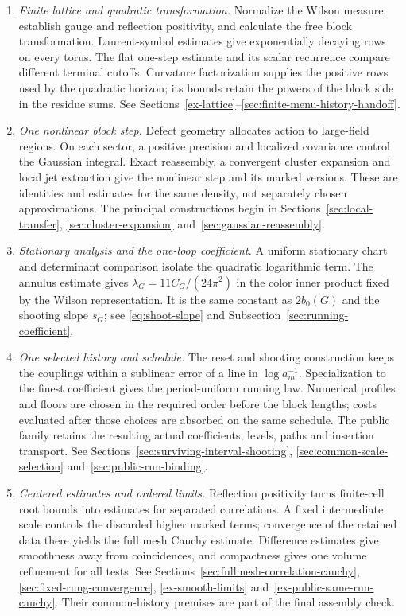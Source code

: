 \begin{enumerate}
\item \emph{Finite lattice and quadratic transformation.}
Normalize the Wilson measure, establish gauge and reflection positivity,
and calculate the free block transformation. Laurent-symbol estimates give
exponentially decaying rows on every torus. The flat one-step estimate and
its scalar recurrence compare different terminal cutoffs. Curvature
factorization supplies the positive rows used by the quadratic horizon;
its bounds retain the powers of the block side in the residue sums.
See Sections~\ref{ex-lattice}--\ref{sec:finite-menu-history-handoff}.

\item \emph{One nonlinear block step.}
Defect geometry allocates action to large-field regions. On each sector,
a positive precision and localized covariance control the Gaussian
integral. Exact reassembly, a convergent cluster expansion and local jet
extraction give the nonlinear step and its marked versions. These are
identities and estimates for the same density, not separately chosen
approximations. The principal constructions begin in
Sections~\ref{sec:local-transfer}, \ref{sec:cluster-expansion}
and~\ref{sec:gaussian-reassembly}.

\item \emph{Stationary analysis and the one-loop coefficient.}
A uniform stationary chart and determinant comparison isolate the
quadratic logarithmic term. The annulus estimate gives
$\lambda_G=11C_G/(24\pi^2)$ in the color inner product fixed by the
Wilson representation. It is the same constant as $2b_0(G)$ and the
shooting slope $s_G$; see \eqref{eq:shoot-slope} and
Subsection~\ref{sec:running-coefficient}.

\item \emph{One selected history and schedule.}
The reset and shooting construction keeps the couplings within a
sublinear error of a line in $\log a_m^{-1}$. Specialization to the
finest coefficient gives the period-uniform running law. Numerical
profiles and floors are chosen in the required order before the block
lengths; costs evaluated after those choices are absorbed on the same
schedule. The public family retains the resulting actual coefficients,
levels, paths and insertion transport. See
Sections~\ref{sec:surviving-interval-shooting},
\ref{sec:common-scale-selection} and~\ref{sec:public-run-binding}.

\item \emph{Centered estimates and ordered limits.}
Reflection positivity turns finite-cell root bounds into estimates for
separated correlations. A fixed intermediate scale controls the discarded
higher marked terms; convergence of the retained data there yields the
full mesh Cauchy estimate. Difference estimates give smoothness away from
coincidences, and compactness gives one volume refinement for all tests.
See Sections~\ref{sec:fullmesh-correlation-cauchy},
\ref{sec:fixed-rung-convergence}, \ref{ex-smooth-limits}
and~\ref{ex-public-same-run-cauchy}. Their common-history premises are
part of the final assembly check.


\end{enumerate}
